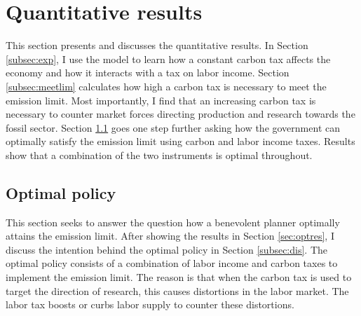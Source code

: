 \section{Quantitative results}\label{sec:res}

This section presents and discusses the quantitative results. 
In Section \ref{subsec:exp}, I use the model to learn how a constant carbon tax affects the economy and how it interacts with a tax on labor income. Section \ref{subsec:meetlim} calculates how high a carbon tax is necessary to meet the emission limit. Most importantly, I find that an increasing carbon tax is necessary to counter market forces directing production and research towards the fossil sector. 
Section \ref{subsec:mr} goes one step further asking  how the government can optimally satisfy the emission limit using carbon and labor income taxes. Results show that a combination of the two instruments is optimal throughout. 




\subsection{Optimal policy}\label{subsec:mr}


This section seeks to answer the question how a benevolent planner optimally attains the emission limit. After showing the results in Section \ref{sec:optres}, I discuss the intention behind the optimal policy in Section \ref{subsec:dis}. The optimal policy consists of a combination of labor income and carbon taxes to implement the emission limit. The reason is that when the carbon tax is used to target the direction of research, this causes distortions in the labor market. The labor tax boosts or curbs labor supply to counter these distortions. 

